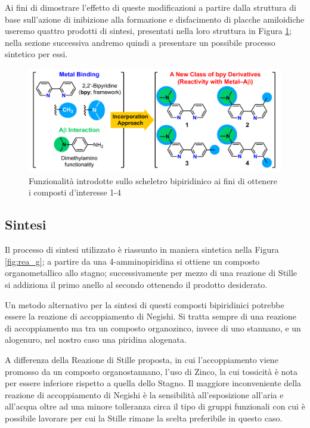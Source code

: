 \documentclass[a4paper, 12pt]{article}
\begin{document}
Ai fini di dimostrare l'effetto di queste modificazioni a partire dalla struttura di base sull'azione di inibizione alla formazione e disfacimento di placche amiloidiche useremo quattro prodotti di sintesi, presentati nella loro struttura in Figura \ref{fig:bpy_mod}; nella sezione successiva andremo quindi a presentare un possibile processo sintetico per essi.

\begin{figure}[H]
	\centering
	\includegraphics[width=\linewidth]{immagini/bpy_mod.png}
	\caption{Funzionalità introdotte sullo scheletro bipiridinico ai fini di ottenere i composti d'interesse 1-4}
	\label{fig:bpy_mod}
\end{figure}

\subsection{Sintesi}
\label{sec:bpy_stille}
Il processo di sintesi utilizzato è riassunto in maniera sintetica nella Figura \ref{fig:rea_g}; a partire da una 4-amminopiridina si ottiene un composto organometallico allo stagno; successivamente per mezzo di una reazione di Stille si addiziona il primo anello al secondo ottenendo il prodotto desiderato.

Un metodo alternativo per la sintesi di questi composti bipiridinici potrebbe essere la reazione di accoppiamento di Negishi. Si tratta sempre di una reazione di accoppiamento ma tra un composto organozinco, invece di uno stannano, e un alogenuro, nel nostro caso una piridina alogenata. \cite{clayden_organic_2012}

A differenza della Reazione di Stille proposta, in cui l'accoppiamento viene promosso da un composto organostannano, l'uso di Zinco, la cui tossicità è nota per essere inferiore rispetto a quella dello Stagno. Il maggiore inconveniente della reazione di accoppiamento di Negishi è la sensibilità all'esposizione all'aria e all'acqua oltre ad una minore tolleranza circa il tipo di gruppi funzionali con cui è possibile lavorare per cui la Stille rimane la scelta preferibile in questo caso. \cite{nicolaou_palladium-catalyzed_2005}
\end{document}

